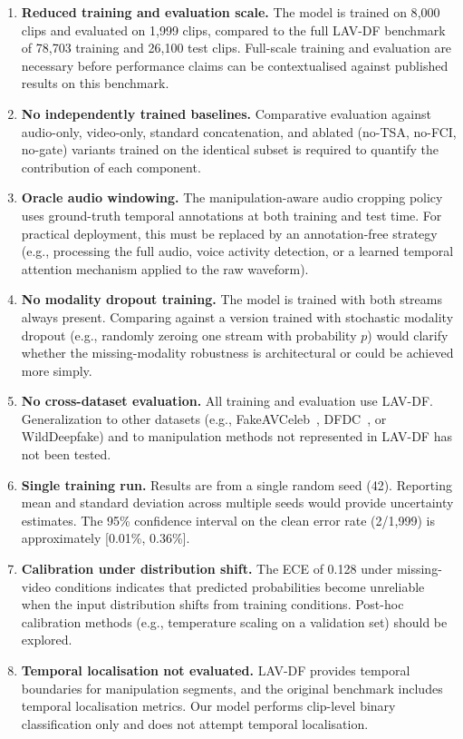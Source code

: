 \documentclass[conference]{IEEEtran}
\begin{document}
\begin{enumerate}
    \item \textbf{Reduced training and evaluation scale.} The model is trained on 8{,}000 clips and evaluated on 1{,}999 clips, compared to the full LAV-DF benchmark of 78{,}703 training and 26{,}100 test clips. Full-scale training and evaluation are necessary before performance claims can be contextualised against published results on this benchmark.

    \item \textbf{No independently trained baselines.} Comparative evaluation against audio-only, video-only, standard concatenation, and ablated (no-TSA, no-FCI, no-gate) variants trained on the identical subset is required to quantify the contribution of each component.

    \item \textbf{Oracle audio windowing.} The manipulation-aware audio cropping policy uses ground-truth temporal annotations at both training and test time. For practical deployment, this must be replaced by an annotation-free strategy (e.g., processing the full audio, voice activity detection, or a learned temporal attention mechanism applied to the raw waveform).

    \item \textbf{No modality dropout training.} The model is trained with both streams always present. Comparing against a version trained with stochastic modality dropout (e.g., randomly zeroing one stream with probability $p$) would clarify whether the missing-modality robustness is architectural or could be achieved more simply.

    \item \textbf{No cross-dataset evaluation.} All training and evaluation use LAV-DF. Generalization to other datasets (e.g., FakeAVCeleb~\cite{khalid2021fakeavceleb}, DFDC~\cite{dolhansky2020dfdc}, or WildDeepfake) and to manipulation methods not represented in LAV-DF has not been tested.

    \item \textbf{Single training run.} Results are from a single random seed (42). Reporting mean and standard deviation across multiple seeds would provide uncertainty estimates. The 95\% confidence interval on the clean error rate (2/1{,}999) is approximately [0.01\%, 0.36\%].

    \item \textbf{Calibration under distribution shift.} The ECE of 0.128 under missing-video conditions indicates that predicted probabilities become unreliable when the input distribution shifts from training conditions. Post-hoc calibration methods (e.g., temperature scaling on a validation set) should be explored.

    \item \textbf{Temporal localisation not evaluated.} LAV-DF provides temporal boundaries for manipulation segments, and the original benchmark includes temporal localisation metrics. Our model performs clip-level binary classification only and does not attempt temporal localisation.
\end{enumerate}
\end{document}
